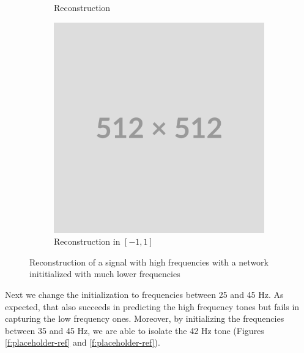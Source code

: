 \begin{figure}
\begin{subfigure}[b]{0.3\textwidth}
        \caption{Reconstruction}
        \label{fig:rec-2pi-w0}
    \end{subfigure}
    \hfill
    \begin{subfigure}[b]{0.3\textwidth}
        \centering
        \includegraphics[width=\textwidth]{img/placeholder512.png}
        \caption{Reconstruction in $[-1, 1]$}
        \label{fig:fft-low-4freqs}
    \end{subfigure}
    \label{f:4freqs-low-reconstruction}
    \caption{Reconstruction of a signal with high frequencies with a network inititialized with much lower frequencies}
\end{figure}

Next we change the initialization to frequencies between 25 and 45 Hz. As expected, that also succeeds in predicting the high frequency tones but fails in capturing the low frequency ones. Moreover, by initializing the frequencies between 35 and 45 Hz, we are able to isolate the 42 Hz tone (Figures \ref{f:placeholder-ref} and \ref{f:placeholder-ref}).

